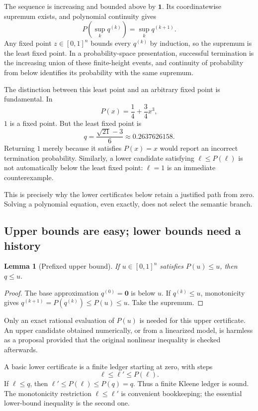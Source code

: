 \documentclass[11pt,a4paper]{article}
\newtheorem{lemma}[theorem]{Lemma}
\theoremstyle{definition}\newtheorem{definition}[theorem]{Definition}
\theoremstyle{remark}\newtheorem{remark}[theorem]{Remark}
\newcommand{\one}{\mathbf 1}\newcommand{\zero}{\mathbf 0}
\begin{document}
The sequence is increasing and bounded above by $\one$. Its coordinatewise supremum exists, and polynomial continuity gives
\[
 P\!\left(\sup_k q^{(k)}\right)=\sup_k q^{(k+1)}.
\]
Any fixed point $z\in[0,1]^n$ bounds every $q^{(k)}$ by induction, so the supremum is the least fixed point. In a probability-space presentation, successful termination is the increasing union of these finite-height events, and continuity of probability from below identifies its probability with the same supremum.

The distinction between this least point and an arbitrary fixed point is fundamental. In
\begin{equation}
 \label{eq:cubic}
 P(x)=\frac14+\frac34x^3,
\end{equation}
$1$ is a fixed point. But the least fixed point is
\begin{equation}
 \label{eq:cubic-root}
 q=\frac{\sqrt{21}-3}{6}\approx0.2637626158.
\end{equation}
Returning $1$ merely because it satisfies $P(x)=x$ would report an incorrect termination probability. Similarly, a lower candidate satisfying $\ell\le P(\ell)$ is not automatically below the least fixed point: $\ell=1$ is an immediate counterexample.

This is precisely why the lower certificates below retain a justified path from zero. Solving a polynomial equation, even exactly, does not select the semantic branch.

\subsection{Upper bounds are easy; lower bounds need a history}
\begin{lemma}[Prefixed upper bound]
\label{lem:upper}
If $u\in[0,1]^n$ satisfies $P(u)\le u$, then $q\le u$.
\end{lemma}
\begin{proof}
The base approximation $q^{(0)}=\zero$ is below $u$. If $q^{(k)}\le u$, monotonicity gives $q^{(k+1)}=P(q^{(k)})\le P(u)\le u$. Take the supremum.
\end{proof}

Only an exact rational evaluation of $P(u)$ is needed for this upper certificate. An upper candidate obtained numerically, or from a linearized model, is harmless as a proposal provided that the original nonlinear inequality is checked afterwards.

A basic lower certificate is a finite ledger starting at zero, with steps
\[
 \ell\le\ell'\le P(\ell).
\]
If $\ell\le q$, then $\ell'\le P(\ell)\le P(q)=q$. Thus a finite Kleene ledger is sound. The monotonicity restriction $\ell\le\ell'$ is convenient bookkeeping; the essential lower-bound inequality is the second one.
\end{document}
